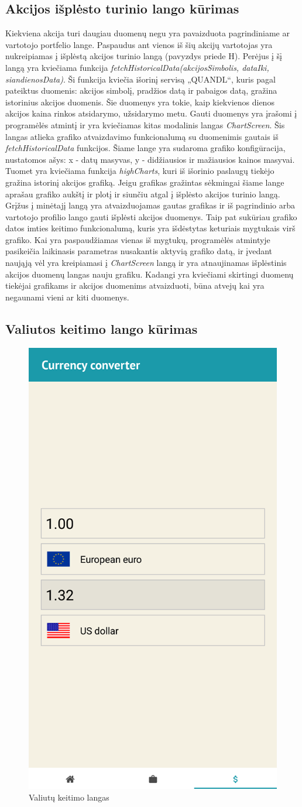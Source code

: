 \documentclass[a4paper,12pt,fleqn]{article}
\begin{document}
\subsection{Akcijos išplėsto turinio lango kūrimas}
Kiekviena akcija turi daugiau duomenų negu yra pavaizduota pagrindiniame ar vartotojo portfelio lange. Paspaudus ant vienos iš šių akcijų vartotojas yra nukreipiamas į išplėstą akcijos turinio langą (pavyzdys priede H). Perėjus į šį langą yra kviečiama funkcija \textit{fetchHistoricalData(akcijosSimbolis, dataIki, siandienosData)}. Ši funkcija kviečia išorinį servisą „QUANDL“, kuris pagal pateiktus duomenis: akcijos simbolį, pradžios datą ir pabaigos datą, gražina istorinius akcijos duomenis. Šie duomenys yra tokie, kaip kiekvienos dienos akcijos kaina rinkos atsidarymo, užsidarymo metu. Gauti duomenys yra įrašomi į programėlės atmintį ir yra kviečiamas kitas modalinis langas \textit{ChartScreen}. Šis langas atlieka grafiko atvaizdavimo funkcionalumą su duomenimis gautais iš \textit{fetchHistoricalData} funkcijos. Šiame lange yra sudaroma grafiko konfigūracija, nustatomos ašys: x - datų masyvas, y - didžiausios ir mažiausios kainos masyvai. Tuomet yra kviečiama funkcija \textit{highCharts}, kuri iš išorinio paslaugų tiekėjo gražina istorinį akcijos grafiką. Jeigu grafikas gražintas sėkmingai šiame lange aprašau grafiko aukštį ir plotį ir siunčiu atgal į išplėsto akcijos turinio langą. Grįžus į minėtajį langą yra atvaizduojamas gautas grafikas ir iš pagrindinio arba vartotojo profilio lango gauti išplėsti akcijos duomenys. Taip pat sukūriau grafiko datos imties keitimo funkcionalumą, kuris yra išdėstytas keturiais mygtukais virš grafiko. Kai yra paspaudžiamas vienas iš mygtukų, programėlės atmintyje pasikeičia laikinasis parametras nusakantis aktyvią grafiko datą, ir įvedant naująją vėl yra kreipiamasi į \textit{ChartScreen} langą ir yra atnaujinamas išplėstinis akcijos duomenų langas nauju grafiku. Kadangi yra kviečiami skirtingi duomenų tiekėjai grafikams ir akcijos duomenims atvaizduoti, būna atvejų kai yra negaunami vieni ar kiti duomenys.

\subsection{Valiutos keitimo lango kūrimas}

\begin{figure}[h]
	\centering
	\includegraphics[width=0.3\linewidth]{currency.png}
	\caption{Valiutų keitimo langas}
	\label{fig:currency}
\end{figure}
\end{document}

